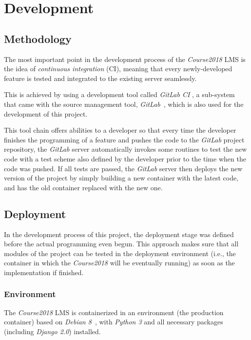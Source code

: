 

\chapter{Development}
\label{chap:DEV}

\section{Methodology}
The most important point in the development process of the \emph{Course2018}
LMS is the idea of \emph{continuous integration} (CI), meaning that every
newly-developed feature is tested and integrated to the existing server seamlessly.

\medskip
This is achieved by using a development tool called \emph{GitLab CI}
\cite{gitlabCI}, a sub-system that came with the source management tool,
\emph{GitLab}~\cite{gitlab}, which is also used for the development of this
project. 

\medskip

This tool chain offers abilities to a developer so that every time
the developer finishes the programming of a feature and pushes the code to the
\emph{GitLab} project repository, the \emph{GitLab} server automatically
invokes some
routines to test the new code with a test scheme also defined by the developer
prior to the time when the code was pushed. If all tests are passed, 
the \emph{GitLab} server then deploys the new version of the project by simply
building a new container with the latest code, and has the old
container replaced with the new one. 

\section{Deployment}
In the development process of this project, the deployment stage was defined
before the actual programming even begun. This approach makes sure that all
modules of the project can be tested in the
deployment environment (i.e., the container in which the \emph{Course2018}
will be eventually running) as soon as the implementation if finished.

\subsection{Environment}
The \emph{Course2018} LMS is containerized in an environment
(the production container) based on
\emph{Debian 8}~\cite{debian}, with \emph{Python 3} and all necessary packages
(including \emph{Django 2.0}) installed.

